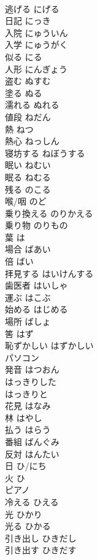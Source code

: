\documentclass[8pt]{extreport}
\begin{document}
\begin{CJK}{UTF8}{min}
\\	逃げる	にげる	
\\	日記	にっき	
\\	入院	にゅういん	
\\	入学	にゅうがく	
\\	似る	にる	
\\	人形	にんぎょう	
\\	盗む	ぬすむ	
\\	塗る	ぬる	
\\	濡れる	ぬれる	
\\	値段	ねだん	
\\	熱	ねつ	
\\	熱心	ねっしん	
\\	寝坊する	ねぼうする	
\\	眠い	ねむい	
\\	眠る	ねむる	
\\	残る	のこる	
\\	喉/咽	のど	
\\	乗り換える	のりかえる	
\\	乗り物	のりもの	
\\	葉	は	
\\	場合	ばあい	
\\	倍	ばい	
\\	拝見する	はいけんする	
\\	歯医者	はいしゃ	
\\	運ぶ	はこぶ	
\\	始める	はじめる	
\\	場所	ばしょ	
\\	筈	はず	
\\	恥ずかしい	はずかしい	
\\	パソコン		
\\	発音	はつおん	
\\	はっきりした		
\\	はっきりと		
\\	花見	はなみ	
\\	林	はやし	
\\	払う	はらう	
\\	番組	ばんぐみ	
\\	反対	はんたい	
\\	日	ひ/にち	
\\	火	ひ	
\\	ピアノ		
\\	冷える	ひえる	
\\	光	ひかり	
\\	光る	ひかる	
\\	引き出し	ひきだし	
\\	引き出す	ひきだす	

\end{CJK}
\end{document}
